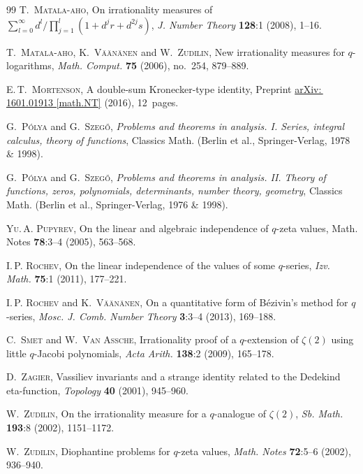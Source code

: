 \documentclass[12pt,reqno]{amsart}
\theoremstyle{remark}
\begin{document}
\begin{thebibliography}{99}
\textsc{T.~Matala-aho},
On irrationality measures of $\sum_{l=0}^\infty d^l/\prod_{j=1}^l(1+d^jr+d^{2j}s)$,
\emph{J. Number Theory} \textbf{128}:1 (2008), 1--16.

\textsc{T.~Matala-aho}, \textsc{K.~V\"a\"an\"anen} and \textsc{W.~Zudilin},
New irrationality measures for $q$-log\-arithms,
\emph{Math. Comput.} \textbf{75} (2006), no.~254, 879--889.

\textsc{E.\,T.~Mortenson},
A double-sum Kronecker-type identity,
Preprint \href{http://arxiv.org/abs/1601.01913}{arXiv:\,1601.01913 [math.NT]} (2016), 12~pages.

\textsc{G.~P\'olya} and \textsc{G.~Szeg\H o},
\emph{Problems and theorems in analysis. I. Series, integral calculus, theory of functions},
Classics Math. (Berlin et al., Springer-Verlag, 1978 \& 1998).

\textsc{G.~P\'olya} and \textsc{G.~Szeg\H o},
\emph{Problems and theorems in analysis. II. Theory of functions, zeros, polynomials, determinants, number theory, geometry},
Classics Math. (Berlin et al., Springer-Verlag, 1976 \& 1998).

\textsc{Yu.\,A. Pupyrev},
On the linear and algebraic independence of $q$-zeta values,
Math. Notes \textbf{78}:3--4 (2005), 563--568.

\textsc{I.\,P. Rochev},
On the linear independence of the values of some $q$-series,
\emph{Izv. Math.} \textbf{75}:1 (2011), 177--221.

\textsc{I.\,P. Rochev} and \textsc{K.~V\"a\"an\"anen},
On a quantitative form of B\'ezivin's method for $q$-series,
\emph{Mosc. J. Comb. Number Theory} \textbf{3}:3--4 (2013), 169--188.

\textsc{C.~Smet} and \textsc{W.~Van Assche},
Irrationality proof of a $q$-extension of $\zeta(2)$ using little $q$-Jacobi polynomials,
\emph{Acta Arith.} \textbf{138}:2 (2009), 165--178.

\textsc{D.~Zagier},
Vassiliev invariants and a strange identity related to the Dedekind eta-function,
\emph{Topology} \textbf{40} (2001), 945--960.

\textsc{W.~Zudilin},
On the irrationality measure for a $q$-analogue of $\zeta(2)$,
\emph{Sb. Math.} \textbf{193}:8 (2002), 1151--1172.

\textsc{W.~Zudilin},
Diophantine problems for $q$-zeta values,
\emph{Math. Notes} \textbf{72}:5--6 (2002), 936--940.


\end{thebibliography}
\end{document}
